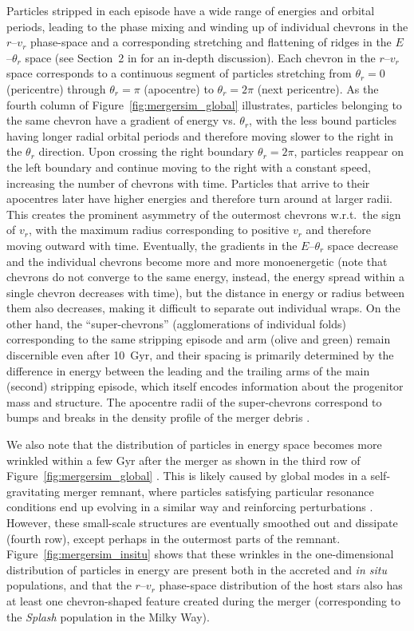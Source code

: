 \documentclass[a4paper,useAMS,usenatbib]{mnras}
\begin{document}
Particles stripped in each episode have a wide range of energies and orbital periods, leading to the phase mixing and winding up of individual chevrons in the $r$--$v_r$ phase-space and a corresponding stretching and flattening of ridges in the $E$--$\theta_r$ space (see Section~2 in \citealt{DongPaez2022} for an in-depth discussion). Each chevron in the $r$--$v_r$ space corresponds to a continuous segment of particles stretching from $\theta_r=0$ (pericentre) through $\theta_r=\pi$ (apocentre) to $\theta_r=2\pi$ (next pericentre). As the fourth column of Figure~\ref{fig:mergersim_global} illustrates, particles belonging to the same chevron have a gradient of energy vs. $\theta_r$, with the less bound particles having longer radial orbital periods and therefore moving slower to the right in the $\theta_r$ direction. Upon crossing the right boundary $\theta_r=2\pi$, particles reappear on the left boundary and continue moving to the right with a constant speed, increasing the number of chevrons with time.
Particles that arrive to their apocentres later have higher energies and therefore turn around at larger radii. This creates the prominent asymmetry of the outermost chevrons w.r.t.\ the sign of $v_r$, with the maximum radius corresponding to positive $v_r$ and therefore moving outward with time. Eventually, the gradients in the $E$--$\theta_r$ space decrease and the individual chevrons become more and more monoenergetic (note that chevrons do not converge to the same energy, instead, the energy spread within a single chevron decreases with time), but the distance in energy or radius between them also decreases, making it difficult to separate out individual wraps. On the other hand, the ``super-chevrons'' (agglomerations of individual folds) corresponding to the same stripping episode and arm (olive and green) remain discernible even after 10~Gyr, and their spacing is primarily determined by the difference in energy between the leading and the trailing arms of the main (second) stripping episode, which itself encodes information about the progenitor mass and structure. The apocentre radii of the super-chevrons correspond to bumps and breaks in the density profile of the merger debris \citep{Deason2018}.

We also note that the distribution of particles in energy space becomes more wrinkled within a few Gyr after the merger as shown in the third row of Figure~\ref{fig:mergersim_global} \citep[see also][]{jb2017}. This is likely caused by global modes in a self-gravitating merger remnant, where particles satisfying particular resonance conditions end up evolving in a similar way and reinforcing perturbations \citep[e.g.,][]{Weinberg1989}. However, these small-scale structures are eventually smoothed out and dissipate (fourth row), except perhaps in the outermost parts of the remnant. 
Figure~\ref{fig:mergersim_insitu} shows that these wrinkles in the one-dimensional distribution of particles in energy are present both in the accreted and \textit{in situ} populations, and that the $r$--$v_r$ phase-space distribution of the host stars also has at least one chevron-shaped feature created during the merger (corresponding to the \textit{Splash} population in the Milky Way).
\end{document}

